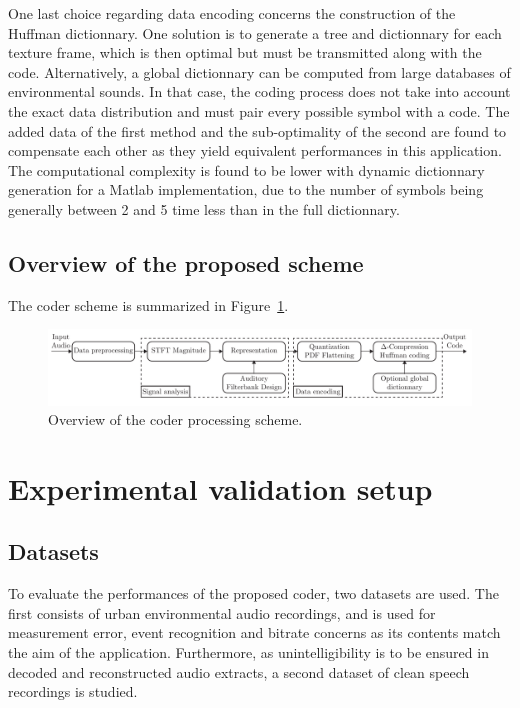\documentclass[12pt,times,onecolumn]{article}
\begin{document}
One last choice regarding data encoding concerns the construction of the Huffman dictionnary. One solution is to generate a tree and dictionnary for each texture frame, which is then optimal but must be transmitted along with the code. Alternatively, a global dictionnary can be computed from large databases of environmental sounds. In that case, the coding process does not take into account the exact data distribution and must pair every possible symbol with a code. The added data of the first method and the sub-optimality of the second are found to compensate each other as they yield equivalent performances in this application. The computational complexity is found to be lower with dynamic dictionnary generation for a Matlab implementation, due to the number of symbols being generally between 2 and 5 time less than in the full dictionnary.

\subsection{Overview of the proposed scheme}
The coder scheme is summarized in Figure~\ref{fig:scheme}.

\begin{figure}[htbp]
	\centering
		\includegraphics[width=1\textwidth]{figures/scheme.pdf}
	\caption{Overview of the coder processing scheme.}
	\label{fig:scheme}
\end{figure}
\section{Experimental validation setup}

\subsection{Datasets}
To evaluate the performances of the proposed coder, two datasets are used. The first consists of urban environmental audio recordings, and is used for measurement error, event recognition and bitrate concerns as its contents match the aim of the application. Furthermore, as unintelligibility is to be ensured in decoded and reconstructed audio extracts, a second dataset of clean speech recordings is studied.
\end{document}
